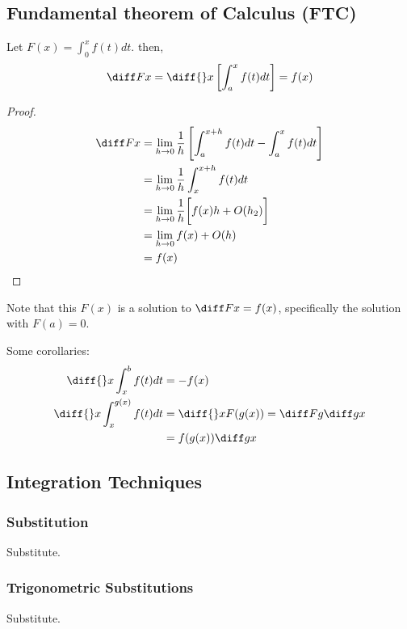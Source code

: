 \documentclass[12pt]{article}
\begin{document}
\subsection{Fundamental theorem of Calculus (FTC)}

\begin{theorem}[FTC]
    Let $F(x) = \int_0^x f(t)dt$. then,
    \[
        \diff Fx = \diff{}x \left[\int_a^x f(t)dt\right] = f(x)
    \]
\end{theorem}
\begin{proof}
    \begin{align*}
        \diff Fx &= \lim_{h\to 0}\frac{1}{h}\left[\int_a^{x+h}f(t)dt
        - \int_a^x f(t) dt\right]\\
                 &= \lim_{h\to 0}\frac{1}{h}
                 \int_x^{x+h}f(t)dt\\
                 &= \lim_{h\to 0}\frac{1}{h}\biggl[
                     f(x)h + O(h_{2})\biggr]\\
                 &= \lim_{h\to 0} f(x) + O(h)\\
                 &= f(x)
    \end{align*}
\end{proof}

Note that this $F(x)$ is a solution to $\diff Fx = f(x)$,
specifically the solution with $F(a)=0$.

Some corollaries:
\begin{align*}
    \diff{}x \int_x^b f(t)dt &= -f(x)\\
    \diff{}x \int_x^{g(x)} f(t)dt &= \diff{}x F(g(x)) = \diff Fg \diff gx\\
                                  &= f(g(x)) \diff gx
\end{align*}

\subsection{Integration Techniques}

\subsubsection*{Substitution}

Substitute.

\subsubsection*{Trigonometric Substitutions}

Substitute.
\end{document}
